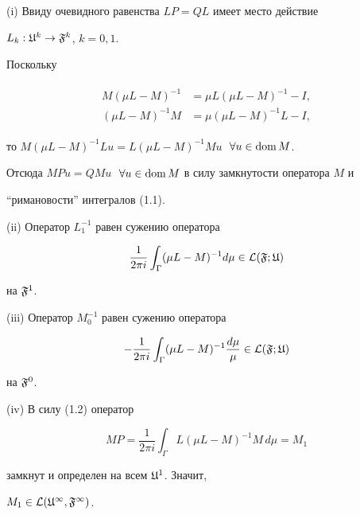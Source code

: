 


\begin{pf} (i) Ввиду очевидного равенства $LP=QL$ имеет место действие 


$L_k:\frak U^k\to\frak F^k$, $k=0,1$. 


Поскольку 


\begin{align} 


\begin{split} 


M(\mu L-M)^{-1} &= \mu L(\mu L-M)^{-1}-I,\\ 


(\mu L-M)^{-1}M &= \mu(\mu L-M)^{-1}L-I, 


\end{split} 


\end{align} 


то $M(\mu L-M)^{-1}Lu=L(\mu L-M)^{-1}Mu\;$ $\forall u\in\operatorname{dom} M$. 


Отсюда $MPu=QMu\;$ $\forall u\in \operatorname{dom} M$ в силу замкнутости оператора $M$ и 


``римановости'' интегралов (1.1). 


 


(ii) Оператор $L_1^{-1}$ равен сужению оператора 


$$ 


\frac{1}{2\pi i}\int_\Gamma(\mu L -M)^{-1}d\mu \in \lc(\ff;\fu) 


$$ 


на $\frak F^1$. 


 


(iii) Оператор $M_0^{-1}$ равен сужению оператора 


$$ 


-\frac{1}{2\pi i}\int_\Gamma(\mu L-M)^{-1}\frac{d \mu}{\mu} 


\in \lc(\ff;\fu) 


$$ 


на $\frak F^0$. 


 


(iv) В силу (1.2) оператор 


$$ 


MP=\frac{1}{2\pi i}\int_\Gamma L(\mu L-M)^{-1}M\,d\mu =M_1 


$$ 


замкнут и определен на всем $\frak U^1$. Значит, 


$M_1\in\cal L(\frak U^1,\frak F^1)$. 


\end{pf} 


